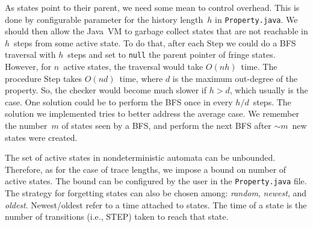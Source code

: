 \documentclass[9pt, preprint]{sigplanconf} %
\theoremstyle{definition}
\theoremstyle{remark}
\begin{document}
As states point to their parent, we need some mean to control overhead.  This is done by configurable parameter for 
the history length~$h$ in {\tt Property.java}.
We should then allow the Java~VM to garbage collect states that are not reachable in $h$~steps from some active state.
To do that, after each {\sc Step} we could do a BFS traversal with $h$~steps and set to {\tt null} the parent pointer of fringe states.
However, for $n$~active states, the traversal would take $O(nh)$~time.
The procedure {\sc Step} takes $O(nd)$~time, where $d$ is the maximum out-degree of the property.
So, the checker would become much slower if $h>d$, which usually is the case.
%
One solution could be to perform the BFS once in every $h/d$~steps.
The solution we implemented tries to better address the average case.
We remember the number~$m$ of states seen by a BFS, and perform the next BFS after $\sim m$~new states were created.

The set of active states in nondeterministic automata can be unbounded.
Therefore, as for the case of trace lengths, we impose a bound on number of active states. 
The bound can be configured by the user  in the {\tt Property.java}  file.  
The  strategy for forgetting states can also be chosen among: {\em random}, {\em newest}, and {\em oldest}.
Newest\slash oldest refer to a time attached to states.
The time  of a state is the number of transitions (i.e., {\sc STEP}) taken to reach that state.



\end{document}
